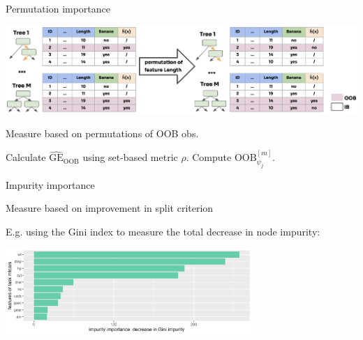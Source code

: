 \documentclass[11pt,compress,t,notes=noshow, xcolor=table]{beamer}
\begin{document}
\begin{vbframe}{Permutation importance}

\includegraphics[width = 1.1\textwidth]{figure_man/forest-permutation-imp.png}
\vspace{-4ex}
\begin{algorithm}[H]
\small
\caption*{Measure based on permutations of OOB obs.}
\begin{algorithmic}[1]
  \State Calculate $\widehat{\mathrm{GE}}_{\text{OOB}}$ using set-based metric $\rho$.
    \State Compute {$\text{OOB}^{[m]}_{\psi_j}$.}
  \EndFor
\end{algorithmic}
\end{algorithm}
\vspace{-3ex}
\end{vbframe}

\begin{vbframe}{Impurity importance}
\vspace{-2ex}
\begin{algorithm}[H]
\small
\caption*{Measure based on improvement in split criterion}
\begin{algorithmic}[1]
  \EndFor
  \EndFor
\end{algorithmic}
\end{algorithm}
\small
E.g. using the Gini index to measure the total decrease in node impurity:

\vspace{-1ex}

\begin{center}
\includegraphics[width=0.7\textwidth]{figure/forest-fimp_gini.png}
\end{center}

\end{vbframe}
\end{document}
